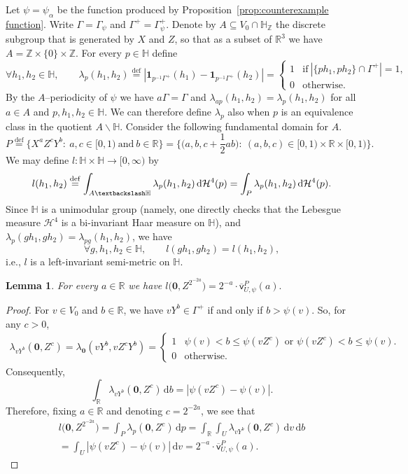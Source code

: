 \documentclass[11pt,reqno]{amsart}
\renewcommand{\H}{\mathbb{H}}
\newcommand{\R}{\mathbb{R}}
\newcommand{\Z}{\mathbb{Z}}
\newcommand{\cH}{\mathcal{H}}
\newcommand{\ud}[0]{\,\mathrm{d}}
\newcommand{\0}{\mathbf{0}}
\renewcommand{\1}{\mathbf 1}
\newcommand{\from}{\colon}
\renewcommand{\subset}{\subseteq}
\newcommand{\eqdef}{\stackrel{\mathrm{def}}{=}}
\renewcommand{\le}{\leqslant}
\newtheorem{lemma}[thm]{Lemma}
\theoremstyle{remark}
\newcommand{\vpP}[1]{{\overline{\mathsf{v}}^{P}_{\!#1}}}
\begin{document}
Let $\psi=\psi_\alpha$ be the function produced by Proposition~\ref{prop:counterexample function}.  Write $\Gamma=\Gamma_\psi$ and $\Gamma^+=\Gamma_\psi^+$. Denote by $A\subset V_0\cap \H_\Z$ the discrete subgroup that is generated by $X$ and $Z$, so that as a subset of $\R^3$ we have $A=\Z\times \{0\}\times \Z$.  For every $p\in \H$ define
$$
\forall  h_1,h_2\in \H,\qquad \lambda_p(h_1,h_2)\eqdef \left|\1_{p^{-1}\Gamma^+}(h_1)-\1_{p^{-1}\Gamma^+}(h_2)\right|=\left\{\begin{array}{ll}1 &\mathrm{if}\ |\{ph_1,ph_2\}\cap \Gamma^+|=1,\\
0&\mathrm{otherwise.}\end{array}\right.
$$
By the $A$--periodicity of $\psi$ we have $a\Gamma=\Gamma$ and  $\lambda_{ap}(h_1,h_2)=\lambda_p(h_1,h_2)$ for all $a\in A$ and $p,h_1,h_2\in \H$. We can therefore  define $\lambda_p$ also when $p$ is an equivalence class in the quotient $A\backslash \H$. Consider the following fundamental domain for $A$.
$$
P\eqdef \big\{X^aZ^cY^b:\ a,c\in [0,1)\ \mathrm{and}\ b\in \R\big\}=\big\{\big(a,b,c+\frac12 ab\big):\ (a,b,c)\in [0,1)\times \R\times [0,1)\big\}.
$$
We may define $l\from \H\times \H\to [0,\infty)$ by
$$
l(h_1,h_2)\eqdef \int_{A\textbackslash \H}\lambda_p(h_1,h_2)\ud \cH^4(p)=\int_{P} \lambda_p(h_1,h_2)\ud \cH^4(p).
$$
Since $\H$ is a unimodular group (namely, one directly checks that the Lebesgue measure $\cH^4$ is a bi-invariant Haar measure on $\H$), and $\lambda_p(gh_1,gh_2)=\lambda_{pg}(h_1,h_2)$, we have
$$
\forall  g,h_1,h_2\in \H,\qquad l(gh_1,gh_2)=l(h_1,h_2),
$$
i.e., $l$ is a left-invariant semi-metric on $\H$.

\begin{lemma}\label{lem:l is vper}
  For every $a\in \R$ we have
  $l\big(\mathbf{0},Z^{2^{-2a}}\big)=2^{-a} \cdot \vpP{U,\psi}(a).$
\end{lemma}
\begin{proof}
  For  $v\in V_0$ and $b\in \R$, we have $v Y^b \in \Gamma^+$ if and only if $b>\psi(v)$.  So, for any $c>0$,
  \begin{align*}
    \lambda_{vY^b}(\mathbf{0},Z^c)
    =\lambda_{\mathbf{0}}(vY^{b}, vZ^c Y^{b})
    = \begin{cases}
      1 & \psi(v)< b \le \psi(vZ^c)\text{ or } \psi(vZ^c) < b \le \psi(v).\\
      0 & \text{otherwise.}
    \end{cases}
  \end{align*}
  Consequently,
  $$\int_{\R} \lambda_{v Y^{b}}(\mathbf{0},Z^c)\ud b = |\psi(vZ^c)-\psi(v)|.$$
  Therefore, fixing $a\in \R$ and denoting $c=2^{-2a}$, we see that
  \begin{multline*}
    l\big(\mathbf{0},Z^{2^{-2a}}\big)=\int_{P}\lambda_{p}(\mathbf{0},Z^{c})\ud p
     =\int_{\R} \int_U \lambda_{vY^b}(\mathbf{0},Z^{c}) \ud v \ud b
   \\ =\int_U |\psi(vZ^{c})-\psi(v)| \ud v
     =2^{-a} \cdot \vpP{U,\psi}(a).\tag*{\qedhere}
  \end{multline*}
\end{proof}
\end{document}
